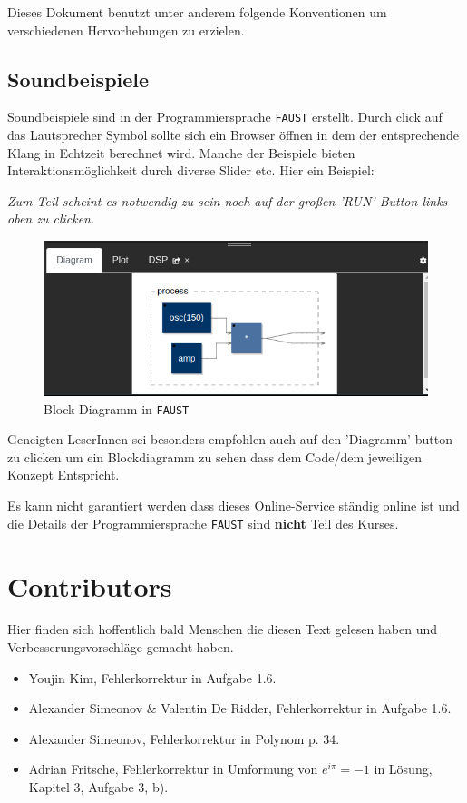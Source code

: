 Dieses Dokument benutzt unter anderem folgende Konventionen um verschiedenen Hervorhebungen zu erzielen. 

\subsection*{Soundbeispiele}

Soundbeispiele sind in der Programmiersprache \texttt{FAUST} erstellt. Durch click auf das Lautsprecher Symbol sollte sich ein Browser öffnen in dem der entsprechende Klang in Echtzeit berechnet wird. Manche der Beispiele bieten Interaktionsmöglichkeit durch diverse Slider etc. Hier ein Beispiel:


\emph{Zum Teil scheint es notwendig zu sein noch auf der großen 'RUN' Button links oben zu clicken.}

\begin{figure}[h!]
	\centering
	\includegraphics[width=0.8 \textwidth]{img/faust_diag.png}
	\caption{Block Diagramm in \texttt{FAUST}}
	\label{fig:faustBlock}
\end{figure}

Geneigten LeserInnen sei besonders empfohlen auch auf den 'Diagramm' button zu clicken um ein Blockdiagramm zu sehen dass dem Code/dem jeweiligen Konzept Entspricht.

Es kann nicht garantiert werden dass dieses Online-Service ständig online ist und die Details der Programmiersprache \texttt{FAUST} sind \textbf{nicht} Teil des Kurses.

\section*{Contributors}
Hier finden sich hoffentlich bald Menschen die diesen Text gelesen haben und Verbesserungsvorschläge gemacht haben.
\begin{itemize}
	\item Youjin Kim, Fehlerkorrektur in Aufgabe 1.6.
	\item Alexander Simeonov \& Valentin De Ridder, Fehlerkorrektur in Aufgabe 1.6.
	\item Alexander Simeonov, Fehlerkorrektur in Polynom p. 34.
	\item Adrian Fritsche, Fehlerkorrektur in Umformung von $e^{i\pi}=-1$ in Lösung, Kapitel 3, Aufgabe 3, b).
\end{itemize}

